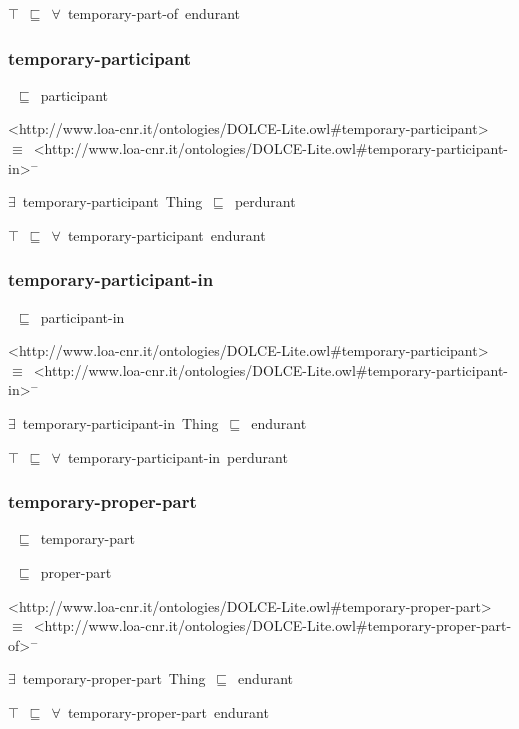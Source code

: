 \documentclass{article}
\begin{document}
\ensuremath{\top}~\ensuremath{\sqsubseteq}~\ensuremath{\forall}~temporary-part-of~endurant

\subsubsection*{temporary-participant}

~\ensuremath{\sqsubseteq}~participant

<http://www.loa-cnr.it/ontologies/DOLCE-Lite.owl#temporary-participant>~\ensuremath{\equiv}~<http://www.loa-cnr.it/ontologies/DOLCE-Lite.owl#temporary-participant-in>\ensuremath{^-}

\ensuremath{\exists}~temporary-participant~Thing~\ensuremath{\sqsubseteq}~perdurant

\ensuremath{\top}~\ensuremath{\sqsubseteq}~\ensuremath{\forall}~temporary-participant~endurant

\subsubsection*{temporary-participant-in}

~\ensuremath{\sqsubseteq}~participant-in

<http://www.loa-cnr.it/ontologies/DOLCE-Lite.owl#temporary-participant>~\ensuremath{\equiv}~<http://www.loa-cnr.it/ontologies/DOLCE-Lite.owl#temporary-participant-in>\ensuremath{^-}

\ensuremath{\exists}~temporary-participant-in~Thing~\ensuremath{\sqsubseteq}~endurant

\ensuremath{\top}~\ensuremath{\sqsubseteq}~\ensuremath{\forall}~temporary-participant-in~perdurant

\subsubsection*{temporary-proper-part}

~\ensuremath{\sqsubseteq}~temporary-part

~\ensuremath{\sqsubseteq}~proper-part

<http://www.loa-cnr.it/ontologies/DOLCE-Lite.owl#temporary-proper-part>~\ensuremath{\equiv}~<http://www.loa-cnr.it/ontologies/DOLCE-Lite.owl#temporary-proper-part-of>\ensuremath{^-}

\ensuremath{\exists}~temporary-proper-part~Thing~\ensuremath{\sqsubseteq}~endurant

\ensuremath{\top}~\ensuremath{\sqsubseteq}~\ensuremath{\forall}~temporary-proper-part~endurant
\end{document}
